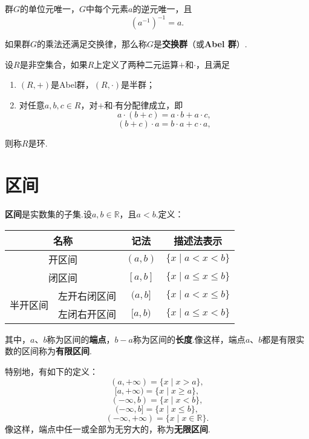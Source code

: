 \begin{property}
群\(G\)的单位元唯一，\(G\)中每个元素\(a\)的逆元唯一，且\[
(a^{-1})^{-1} = a.
\]
\end{property}

\begin{definition}
如果群\(G\)的乘法还满足交换律，那么称\(G\)是\textbf{交换群}（或\textbf{Abel 群}）.
\end{definition}

\begin{theorem}
设\(R\)是非空集合，如果\(R\)上定义了两种二元运算\(+\)和\(\cdot\)，且满足\begin{enumerate}
\item \((R,+)\)是Abel群，\((R,\cdot)\)是半群；
\item 对任意\(a,b,c \in R\)，对\(+\)和\(\cdot\)有分配律成立，即\[
a \cdot (b + c) = a \cdot b + a \cdot c,
\]\[
(b + c) \cdot a = b \cdot a + c \cdot a,
\]
\end{enumerate}则称\(R\)是环.
\end{theorem}


\section{区间}
\begin{definition}[区间]
\textbf{区间}是实数集的子集.设\(a,b\in\mathbb{R}\)，且\(a<b\).定义：
\begin{center}
\begin{tabular}{|c|c|c|c|} \hline
\multicolumn{2}{|c|}{名称} & 记法 & 描述法表示 \\ \hline
\multicolumn{2}{|c|}{开区间} & \((a,b)\) & \(\{ x \mid a < x < b \}\) \\ \hline
\multicolumn{2}{|c|}{闭区间} & \([a,b]\) & \(\{ x \mid a \leqslant x \leqslant b \}\) \\ \hline
\multirow{2}{*}{半开区间} & 左开右闭区间 & \((a,b]\) & \(\{ x \mid a < x \leqslant b \}\) \\ \cline{2-4}
& 左闭右开区间 & \([a,b)\) & \(\{ x \mid a \leqslant x < b \}\) \\ \hline
\end{tabular}
\end{center}
其中，\(a\)、\(b\)称为区间的\textbf{端点}，\(b-a\)称为区间的\textbf{长度}.像这样，端点\(a\)、\(b\)都是有限实数的区间称为\textbf{有限区间}.

特别地，有如下的定义：
\[ (a,+\infty) = \{ x \mid x > a\}, \]
\[ [a,+\infty) = \{ x \mid x \geqslant a\}, \]
\[ (-\infty,b) = \{ x \mid x < b\}, \]
\[ (-\infty,b] = \{ x \mid x \leqslant b\}, \]
\[ (-\infty,+\infty) = \{ x \mid x \in \mathbb{R} \}. \]
像这样，端点中任一或全部为无穷大的，称为\textbf{无限区间}.
\end{definition}


